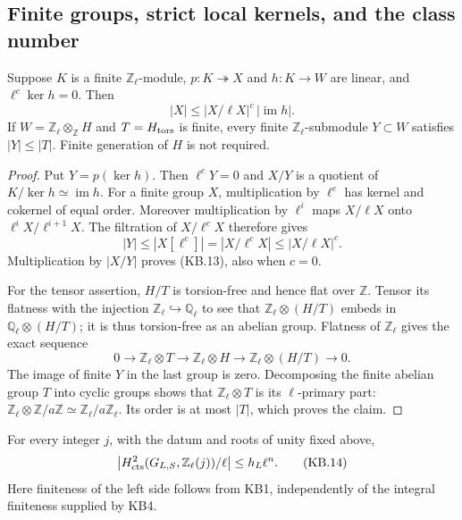 \subsection{Finite groups, strict local kernels, and the class number}

\begin{proposition}
\label{claim:KB5}
Suppose $K$ is a finite $\mathbb Z_\ell$-module,
$p:K\twoheadrightarrow X$ and $h:K\to W$ are linear, and
$\ell^c\ker h=0$.  Then
\[
                  |X|\le |X/\ell X|^c\,|\operatorname{im}h|.
 \tag{KB.13}
\]
If $W=\mathbb Z_\ell\otimes_{\mathbb Z}H$ and $T=H_{\rm tors}$
is finite, every finite $\mathbb Z_\ell$-submodule $Y\subset W$
satisfies $|Y|\le|T|$.  Finite generation of $H$ is not required.
\end{proposition}

\begin{proof}
Put $Y=p(\ker h)$.  Then $\ell^cY=0$ and $X/Y$ is a quotient
of $K/\ker h\simeq\operatorname{im}h$.  For a finite group $X$,
multiplication by $\ell^c$ has kernel and cokernel of equal order.
Moreover multiplication by $\ell^i$ maps $X/\ell X$ onto
$\ell^iX/\ell^{i+1}X$.  The filtration of $X/\ell^cX$ therefore
gives
\[
 |Y|\le|X[\ell^c]|=|X/\ell^cX|
                \le|X/\ell X|^c.
\]
Multiplication by $|X/Y|$ proves (KB.13), also when $c=0$.

For the tensor assertion, $H/T$ is torsion-free and hence flat over
$\mathbb Z$.  Tensor its flatness with the injection
$\mathbb Z_\ell\hookrightarrow\mathbb Q_\ell$ to see that
$\mathbb Z_\ell\otimes(H/T)$ embeds in
$\mathbb Q_\ell\otimes(H/T)$; it is thus torsion-free as an
abelian group.  Flatness of $\mathbb Z_\ell$ gives the exact sequence
\[
 0\longrightarrow\mathbb Z_\ell\otimes T
 \longrightarrow\mathbb Z_\ell\otimes H
 \longrightarrow\mathbb Z_\ell\otimes(H/T)\longrightarrow0.
\]
The image of finite $Y$ in the last group is zero.
Decomposing the finite abelian group $T$ into cyclic groups shows
that $\mathbb Z_\ell\otimes T$ is its $\ell$-primary part:
$\mathbb Z_\ell\otimes\mathbb Z/a\mathbb Z
\simeq\mathbb Z_\ell/a\mathbb Z_\ell$.
Its order is at most $|T|$, which proves the claim.
\end{proof}

\begin{proposition}
\label{claim:KB6}
For every integer $j$, with the datum and roots of unity fixed above,
\[
 \left|H^2_{\rm cts}(G_{L,S},\mathbb Z_\ell(j))/\ell\right|
                         \le h_L\ell^n.
 \tag{KB.14}
\]
Here finiteness of the left side follows from KB1, independently of
the integral finiteness supplied by KB4.
\end{proposition}

